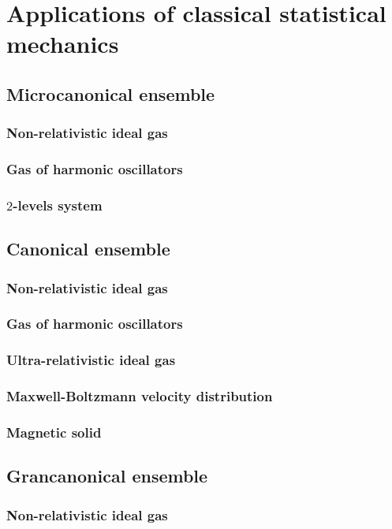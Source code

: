 \part{Applications of classical statistical mechanics}

\chapter{Microcanonical ensemble}
\section{Non-relativistic ideal gas}
\section{Gas of harmonic oscillators}
\section{$2$-levels system}

\chapter{Canonical ensemble}
\section{Non-relativistic ideal gas}
\section{Gas of harmonic oscillators}
\section{Ultra-relativistic ideal gas}
\section{Maxwell-Boltzmann velocity distribution}
\section{Magnetic solid}

\chapter{Grancanonical ensemble}
\section{Non-relativistic ideal gas}
